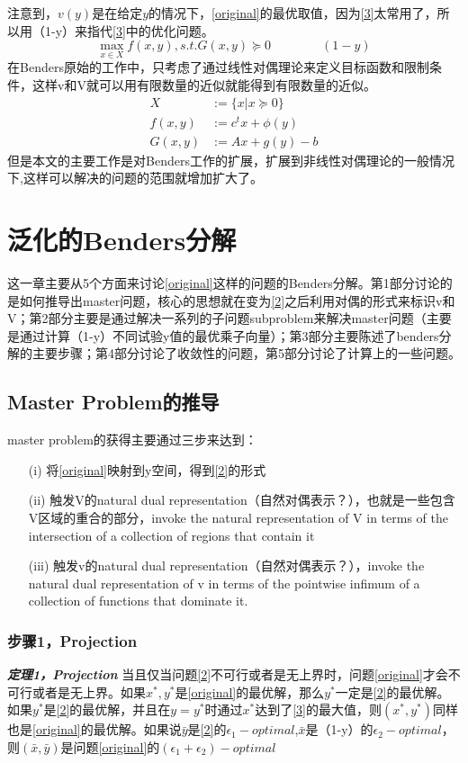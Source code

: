 \documentclass[UTF8,a4]{article}
\begin{document}
注意到，$v(y)$是在给定$y$的情况下，\eqref{original}的最优取值，因为\eqref{3}太常用了，所以用（1-y）来指代\eqref{3}中的优化问题。
$$\max_{x\in X}f(x,y),s.t. G(x,y)\succeq 0 \quad\quad\quad\quad(1-y)$$
在Benders原始的工作中，只考虑了通过线性对偶理论来定义目标函数和限制条件，这样v和V就可以用有限数量的近似就能得到有限数量的近似。
\begin{subequations}
\begin{align}
X&:=\{x|x\succeq0 \}\\
f(x,y)&:=c^tx+\phi(y)\\
G(x,y)&:=Ax+g(y)-b
\end{align}
\end{subequations}
但是本文的主要工作是对Benders工作的扩展，扩展到非线性对偶理论的一般情况下,这样可以解决的问题的范围就增加扩大了。
\section{泛化的Benders分解}
这一章主要从5个方面来讨论\eqref{original}这样的问题的Benders分解。第1部分讨论的是如何推导出master问题，核心的思想就在变为\eqref{2}之后利用对偶的形式来标识v和V；第2部分主要是通过解决一系列的子问题subproblem来解决master问题（主要是通过计算（1-y）不同试验y值的最优乘子向量）；第3部分主要陈述了benders分解的主要步骤；第4部分讨论了收敛性的问题，第5部分讨论了计算上的一些问题。
\subsection{Master Problem的推导}
master problem的获得主要通过三步来达到：
\begin{itemize}
\item[(i)]将\eqref{original}映射到y空间，得到\eqref{2}的形式
\item[(ii)]触发V的natural dual representation（自然对偶表示？），也就是一些包含V区域的重合的部分，invoke the natural representation of V in terms of the intersection of a collection of regions  that contain it
\item[(iii)]触发v的natural dual representation（自然对偶表示？），invoke the natural dual representation of v in terms of the pointwise infimum of a collection of functions that dominate it.
\end{itemize}
\subsubsection{步骤1，Projection}
\textbf{\emph{定理1，Projection}}
当且仅当问题\eqref{2}不可行或者是无上界时，问题\eqref{original}才会不可行或者是无上界。如果$x^*,y^*$是\eqref{original}的最优解，那么$y^*$一定是\eqref{2}的最优解。如果$y^*$是\eqref{2}的最优解，并且在$y=y^*$时通过$x^*$达到了\eqref{3}的最大值，则$(x^*,y^*)$同样也是\eqref{original}的最优解。如果说$\bar{y}$是\eqref{2}的$\epsilon_1-optimal$,$\bar{x}$是（1-y）的$\epsilon_2-optimal$，则$(\bar{x},\bar{y})$是问题\eqref{original}的$(\epsilon_1+\epsilon_2)-optimal$
\end{document}
